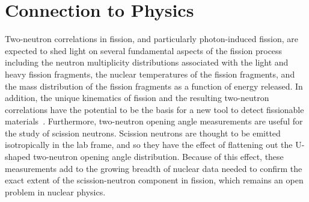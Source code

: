 \section{Connection to Physics}
Two-neutron correlations in fission, and particularly photon-induced fission, are expected to shed light on several fundamental aspects of the fission process including the neutron multiplicity distributions associated with the light and heavy fission fragments, the nuclear temperatures of the fission fragments, and the mass distribution of the fission fragments as a function of energy released.
In addition, the unique kinematics of fission and the resulting two-neutron correlations have the potential to be the basis for a new tool to detect fissionable materials~\cite{Talou2018}.
Furthermore, two-neutron opening angle measurements are useful for the study of scission neutrons.
Scission neutrons are thought to be emitted isotropically in the lab frame, and so they have the effect of flattening out the U-shaped two-neutron opening angle distribution.
Because of this effect, these measurements add to the growing breadth of nuclear data needed to confirm the exact extent of the scission-neutron component in fission, which remains an open problem in nuclear physics.

